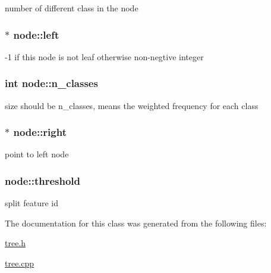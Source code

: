 number of different class in the node \hypertarget{classnode_a7cbff55ff448f557223f79299056e9b1}{
\subsubsection[{left}]{$\ast$ node\+::left}}\label{classnode_a7cbff55ff448f557223f79299056e9b1}
-\/1 if this node is not leaf otherwise non-\/negtive integer \hypertarget{classnode_a8c4864582cb3fe15e84e7908d0965150}{
\subsubsection[{n\+\_\+classes}]{\setlength{\rightskip}{0pt plus 5cm}int node\+::n\+\_\+classes}}\label{classnode_a8c4864582cb3fe15e84e7908d0965150}
size should be {\ttfamily n\+\_\+classes}, means the weighted frequency for each class \hypertarget{classnode_abdc86d4c8604c481752953af3235fc47}{
\subsubsection[{right}]{$\ast$ node\+::right}}\label{classnode_abdc86d4c8604c481752953af3235fc47}
point to left node \hypertarget{classnode_a3774a77cb58d1554f63f34cbcb737a0c}{
\subsubsection[{threshold}]{ node\+::threshold}}\label{classnode_a3774a77cb58d1554f63f34cbcb737a0c}
split feature id 

The documentation for this class was generated from the following files\+:\begin{DoxyCompactItemize}
\item 
\hyperlink{tree_8h}{tree.\+h}\item 
\hyperlink{tree_8cpp}{tree.\+cpp}\end{DoxyCompactItemize}
